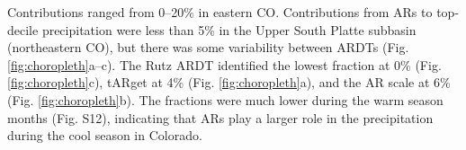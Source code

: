 \documentclass[draft]{agujournal2019}
\begin{document}
Contributions ranged from 0--20\% in eastern CO. Contributions from ARs to top-decile precipitation were less than 5\% in the Upper South Platte subbasin (northeastern CO), but there was some variability between ARDTs (Fig. \ref{fig:choropleth}a--c). The Rutz ARDT identified the lowest fraction at 0\% (Fig. \ref{fig:choropleth}c), tARget at 4\% (Fig. \ref{fig:choropleth}a), and the AR scale at 6\% (Fig. \ref{fig:choropleth}b). The fractions were much lower during the warm season months (Fig. S12), indicating that ARs play a larger role in the precipitation during the cool season in Colorado.




\end{document}
